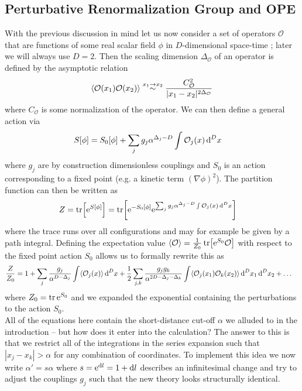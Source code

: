\documentclass[english, parskip=full]{scrartcl}
\begin{document}
\subsection{Perturbative Renormalization Group and OPE}
With the previous discussion in mind let us now consider a set of operators $\mathcal{O}$ that are functions of some real scalar field $\phi$ in $D$-dimensional space-time ; later we will always use $D=2$.
Then the scaling dimension $\Delta_{\mathcal{O}}$ of an operator is defined by the asymptotic relation
\begin{align}
\bra*{\mathcal{O}(x_1) \mathcal{O}(x_2)} \overset{x_1\rightarrow x_2}{\sim} \frac{C_{\mathcal{O}}^2}{|x_1-x_2|^{2\Delta_{\mathcal{O}}}}
\end{align}
where $C_\mathcal{O}$ is some normalization of the operator.
We can then define a general action via
\begin{align}
S[\phi] &= S_0[\phi] + \sum_j g_j \alpha^{\Delta_{j} - D} \int \mathcal{O}_j(x)\,\d^Dx
\end{align}
where $g_j$ are by construction dimensionless couplings and $S_0$ is an action corresponding to a fixed point (e.g. a kinetic term $(\nabla\phi)^2$).
The partition function can then be written as
\begin{align}
Z &= \tr \klb*{\powe{S[\phi]}} = \tr \klb*{\powe{-S_0[\phi]} \powe{\sum_j g_j \alpha^{\Delta_{j} - D} \int \mathcal{O}_j(x)\,\d^Dx}}
\end{align}
where the trace runs over all configurations and may for example be given by a path integral.
Defining the expectation value $\bra*{\mathcal{O}} = \frac{1}{Z_0} \tr \klb*{ \powe{S_0} \mathcal{O}}$ with respect to the fixed point action $S_0$ allows us to formally rewrite this as
\begin{align}
\frac{Z}{Z_0} &=1 + \sum_j \frac{g_j}{\alpha^{D-\Delta_{j}}} \int \bra*{\mathcal{O}_j(x)}\,\d^Dx + \frac{1}{2} \sum_{j,k} \frac{g_j g_k}{\alpha^{2D-\Delta_{j}-\Delta_{k}}} \int \bra*{\mathcal{O}_j(x_1) \mathcal{O}_k(x_2)}\,\d^Dx_1\,\d^Dx_2 + \dots 
\end{align}
where $Z_0=\tr \powe{S_0}$ and we expanded the exponential containing the perturbations to the action $S_0$.\\
All of the equations here contain the short-distance cut-off $\alpha$ we alluded to in the introduction -- but how does it enter into the calculation?
The answer to this is that we restrict all of the integrations in the series expansion such that $|x_j - x_k| > \alpha$ for any combination of coordinates.
To implement this idea we now write $\alpha'=s\alpha$ where $s=\powe{\d l} = 1 + \d l$ describes an infinitesimal change and try to adjust the couplings $g_j$ such that the new theory looks structurally identical.
\end{document}
